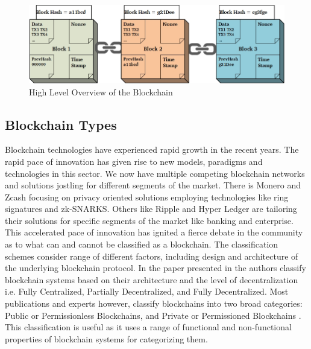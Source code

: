 \begin{figure}[b]
	\centering
    \includegraphics[width=160mm,scale=0.5]{figs/blockchain}
	\caption{High Level Overview of the Blockchain}
	\label{fig:blockchain}
\end{figure}
\clearpage  
\subsection{Blockchain Types}
Blockchain technologies have experienced rapid growth in the recent years. The rapid pace of innovation has given rise to new models, paradigms and technologies in this sector. We now have multiple competing blockchain networks and solutions jostling for different segments of the market. There is Monero and Zcash focusing on privacy oriented solutions employing technologies like ring signatures \cite{paper:008} and zk-SNARKS. Others like Ripple and Hyper Ledger are tailoring their solutions for specific segments of the market like banking and enterprise. This accelerated pace of innovation has ignited a fierce debate in the community as to what can and cannot be classified as a blockchain. The classification schemes consider range of different factors,  including design and architecture of the underlying blockchain protocol. In the paper presented in \cite{7930224} the authors classify blockchain systems based on their architecture and the level of decentralization i.e. Fully Centralized, Partially Decentralized, and Fully Decentralized. Most publications and experts however, classify blockchains into two broad categories: Public or Permissionless Blockchains, and Private or Permissioned Blockchains \cite{misc:017}. This classification is useful as it uses a range of functional and non-functional properties of blockchain systems for categorizing them.
\vspace{1cm}
